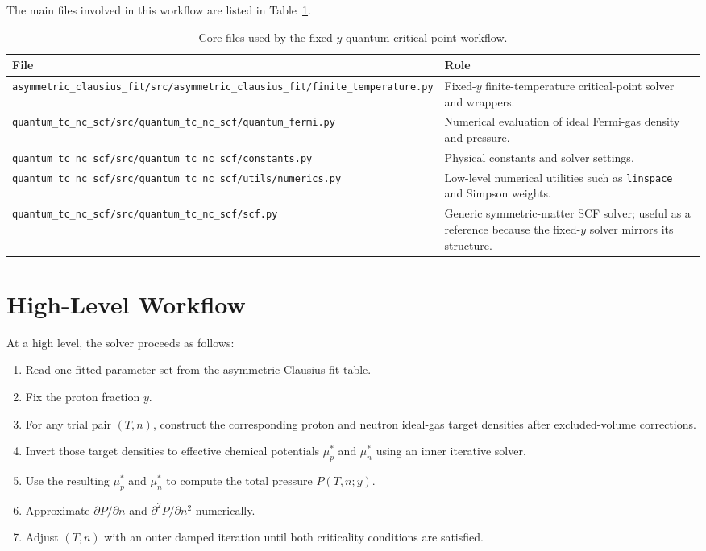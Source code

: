 \documentclass[11pt]{article}
\begin{document}
The main files involved in this workflow are listed in
Table~\ref{tab:files}.

\begin{table}[h]
\centering
\begin{tabular}{>{\raggedright\arraybackslash}p{} >{\raggedright\arraybackslash}p{}}
\toprule
File & Role \\
\midrule
\texttt{asymmetric\_clausius\_fit/src/asymmetric\_clausius\_fit/finite\_temperature.py} & Fixed-$y$ finite-temperature critical-point solver and wrappers. \\
\texttt{quantum\_tc\_nc\_scf/src/quantum\_tc\_nc\_scf/quantum\_fermi.py} & Numerical evaluation of ideal Fermi-gas density and pressure. \\
\texttt{quantum\_tc\_nc\_scf/src/quantum\_tc\_nc\_scf/constants.py} & Physical constants and solver settings. \\
\texttt{quantum\_tc\_nc\_scf/src/quantum\_tc\_nc\_scf/utils/numerics.py} & Low-level numerical utilities such as \texttt{linspace} and Simpson weights. \\
\texttt{quantum\_tc\_nc\_scf/src/quantum\_tc\_nc\_scf/scf.py} & Generic symmetric-matter SCF solver; useful as a reference because the fixed-$y$ solver mirrors its structure. \\
\bottomrule
\end{tabular}
\caption{Core files used by the fixed-$y$ quantum critical-point workflow.}
\label{tab:files}
\end{table}

\section{High-Level Workflow}

At a high level, the solver proceeds as follows:

\begin{enumerate}
\item Read one fitted parameter set from the asymmetric Clausius fit table.
\item Fix the proton fraction $y$.
\item For any trial pair $(T,n)$, construct the corresponding proton and neutron
ideal-gas target densities after excluded-volume corrections.
\item Invert those target densities to effective chemical potentials
$\mu_p^\ast$ and $\mu_n^\ast$ using an inner iterative solver.
\item Use the resulting $\mu_p^\ast$ and $\mu_n^\ast$ to compute the total
pressure $P(T,n;y)$.
\item Approximate $\partial P/\partial n$ and $\partial^2 P/\partial n^2$
numerically.
\item Adjust $(T,n)$ with an outer damped iteration until both criticality
conditions are satisfied.
\end{enumerate}
\end{document}
